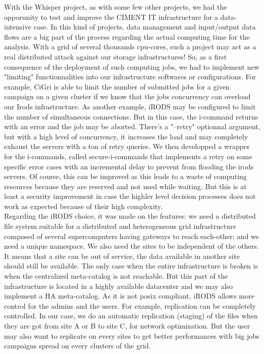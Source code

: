 \documentclass[a4paper, 10pt]{article}
\begin{document}
\begin{multicols}{2}
With the Whisper project, as with some few other projects, we had the opporunity to test and improve the CIMENT IT infrastructure for a data-intensive case. In this kind of projects, data management and input/output data flows are a big part of the process regarding the actual computing time for the analysis. With a grid of several thousands cpu-cores, such a project may act as a real distributed attack against our storage infrastructures! So, as a first consequence of the deployment of such computing jobs, we had to implement new "limiting" functionnalities into our infrastructure softwares or configurations. For example, CiGri is able to limit the number of submitted jobs for a given campaign on a given cluster if we know that the jobs concurrency can overload our Irods infrastructure. As another example, iRODS may be configured to limit the number of simultaneous connections. But in this case, the i-command returns with an error and the job may be aborted. There's a "--retry" optionnal argument, but with a high level of concurrency, it increases the load and may completely exhaust the servers with a ton of retry queries. We then developped a wrapper for the i-commands, called secure-i-commands that implements a retry on some specific error cases  with an incremental delay to prevent from flooding the irods servers. Of course, this can be improved as this leads to a waste of computing resources because they are reserved and not used while waiting. But this is at least a security improvement in case the highler level decision processes does not work as expected because of their high complexity.
\\
Regarding the iRODS choice, it was made on the features: we need a distributed file system suitable for a distributed and heterogeneous grid infrastructure composed of several supercomputers having gateways to reach each-other; and we need a unique namespace. We also need the sites to be independent of the others. It means that a site can be out of service, the data available in another site should still be available. The only case when the entire infrastructure is broken is when the centralized meta-catalog is not reachable. But this part of the infrastructure is located in a highly available datacenter and we may also implement a HA meta-catalog. As it is not posix compliant, iRODS allows more control for the admins and the users. For example, replication can be completely controlled. In our case, we do an automatic replication (staging) of the files when they are got from site A or B to site C, for network optimization. But the user may also want to replicate on every sites to get better performances with big jobs campaigns spread on every clusters of the grid. 

\end{multicols}
\end{document}
